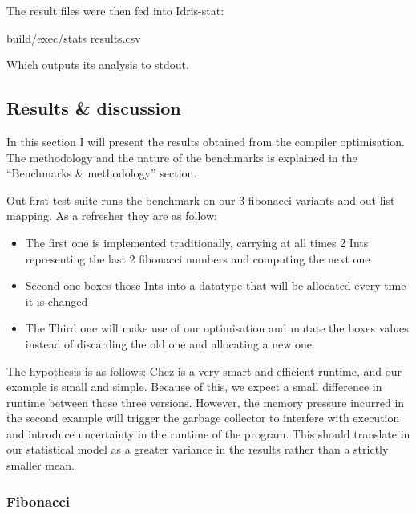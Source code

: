 \documentclass[
]{article}
\newenvironment{Shaded}{}{}
\newcommand{\NormalTok}[1]{#1}
\newcommand{\OperatorTok}[1]{\textcolor[rgb]{0.40,0.40,0.40}{#1}}
\providecommand{\tightlist}{%
  \setlength{\itemsep}{0pt}\setlength{\parskip}{0pt}}
\begin{document}
The result files were then fed into Idris-stat:

\begin{Shaded}
\begin{Highlighting}[]
\NormalTok{build}\OperatorTok{/}\NormalTok{exec}\OperatorTok{/}\NormalTok{stats results}\OperatorTok{.}\NormalTok{csv}
\end{Highlighting}
\end{Shaded}

Which outputs its analysis to stdout.

\hypertarget{results-discussion}{%
\subsection{Results \& discussion}\label{results-discussion}}

In this section I will present the results obtained from the compiler
optimisation. The methodology and the nature of the benchmarks is
explained in the ``Benchmarks \& methodology'' section.

Out first test suite runs the benchmark on our 3 fibonacci variants and
out list mapping. As a refresher they are as follow:

\begin{itemize}
\tightlist
\item
  The first one is implemented traditionally, carrying at all times 2
  Ints representing the last 2 fibonacci numbers and computing the next
  one
\item
  Second one boxes those Ints into a datatype that will be allocated
  every time it is changed
\item
  The Third one will make use of our optimisation and mutate the boxes
  values instead of discarding the old one and allocating a new one.
\end{itemize}

The hypothesis is as follows: Chez is a very smart and efficient
runtime, and our example is small and simple. Because of this, we expect
a small difference in runtime between those three versions. However, the
memory pressure incurred in the second example will trigger the garbage
collector to interfere with execution and introduce uncertainty in the
runtime of the program. This should translate in our statistical model
as a greater variance in the results rather than a strictly smaller
mean.

\hypertarget{fibonacci-1}{%
\subsubsection{Fibonacci}\label{fibonacci-1}}
\end{document}
